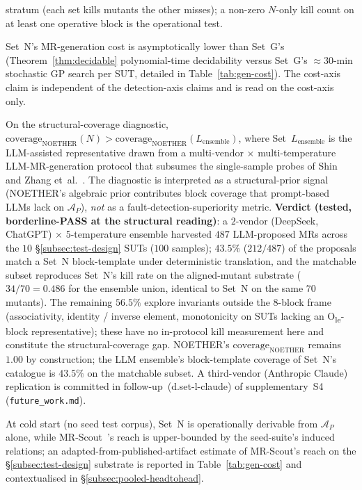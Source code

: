 \documentclass[acmsmall, screen]{acmart}
\begin{document}
\begin{description}
\begin{description}
      stratum (each set kills mutants the other misses); a
      non-zero $N$-only kill count on at least one operative block
      is the operational test.
    \item[H3a.3 (Cost-axis).] Set~N's MR-generation cost is
      asymptotically lower than Set~G's
      (Theorem~\ref{thm:decidable} polynomial-time decidability
      versus Set~G's $\approx 30$-min stochastic GP search per SUT,
      detailed in Table~\ref{tab:gen-cost}). The cost-axis claim is
      independent of the detection-axis claims and is read on the
      cost-axis only.
  \end{description}
  \item[Pre-registered hypothesis (H3b, vs LLM-assisted baseline).] On the structural-coverage diagnostic, $\mathrm{coverage}_{\mathrm{NOETHER}}(N) > \mathrm{coverage}_{\mathrm{NOETHER}}(L_{\mathrm{ensemble}})$, where Set~$L_{\mathrm{ensemble}}$ is the LLM-assisted representative drawn from a multi-vendor $\times$ multi-temperature LLM-MR-generation protocol that subsumes the single-sample probes of Shin~\cite{Shin2024} and Zhang et~al.~\cite{ZhangChatGPTMR2023}. The diagnostic is interpreted as a structural-prior signal (NOETHER's algebraic prior contributes block coverage that prompt-based LLMs lack on $\mathcal{A}_P$), \emph{not} as a fault-detection-superiority metric. \textbf{Verdict (tested, borderline-PASS at the structural reading)}: a $2$-vendor (DeepSeek, ChatGPT) $\times$ $5$-temperature ensemble harvested $487$ LLM-proposed MRs across the $10$ \S\ref{subsec:test-design} SUTs ($100$ samples); $43.5\%$ ($212/487$) of the proposals match a Set~N block-template under deterministic translation, and the matchable subset reproduces Set~N's kill rate on the aligned-mutant substrate ($34/70 = 0.486$ for the ensemble union, identical to Set~N on the same $70$ mutants). The remaining $56.5\%$ explore invariants outside the $8$-block frame (associativity, identity / inverse element, monotonicity on SUTs lacking an O\textsubscript{le}-block representative); these have no in-protocol kill measurement here and constitute the structural-coverage gap. NOETHER's $\mathrm{coverage}_{\mathrm{NOETHER}}$ remains $1.00$ by construction; the LLM ensemble's block-template coverage of Set~N's catalogue is $43.5\%$ on the matchable subset. A third-vendor (Anthropic Claude) replication is committed in follow-up~(d.set-l-claude) of supplementary~S4 (\texttt{future\_work.md}).
  \item[Pre-registered hypothesis (H3c, vs mining-based baseline).] At cold start (no seed test corpus), Set~N is operationally derivable from $\mathcal{A}_P$ alone, while MR-Scout~\cite{MRScout2024}'s reach is upper-bounded by the seed-suite's induced relations; an adapted-from-published-artifact estimate of MR-Scout's reach on the §\ref{subsec:test-design} substrate is reported in Table~\ref{tab:gen-cost} and contextualised in \S\ref{subsec:pooled-headtohead}.

\end{description}
\end{document}
